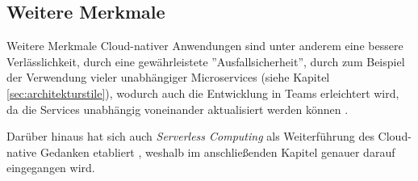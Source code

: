 \subsection{Weitere Merkmale}
Weitere Merkmale Cloud-nativer Anwendungen sind unter anderem eine bessere Verlässlichkeit, durch eine gewährleistete ''Ausfallsicherheit'', durch zum Beispiel der Verwendung vieler unabhängiger Microservices (siehe Kapitel \ref{sec:architekturstile}), wodurch auch die Entwicklung in Teams erleichtert wird, da die Services unabhängig voneinander aktualisiert werden können \cite[Vgl.][]{VMwareb}.

Darüber hinaus hat sich auch \textit{Serverless Computing} als Weiterführung des Cloud-native Gedanken etabliert \cite[Vgl.][S. 1]{CNCF2018}, weshalb im anschließenden Kapitel genauer darauf eingegangen wird. \pagebreak